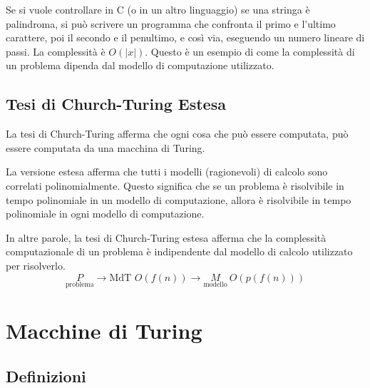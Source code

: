 Se si vuole controllare in C (o in un altro linguaggio) se una stringa è palindroma, si può scrivere un programma che confronta il primo e l'ultimo carattere, poi il secondo e il penultimo, e così via, eseguendo un numero lineare di passi. La complessità è $O(|x|)$. Questo è un esempio di come la complessità di un problema dipenda dal modello di computazione utilizzato.


\section{Tesi di Church-Turing Estesa} La tesi di Church-Turing afferma che ogni cosa che può essere computata, può essere computata da una macchina di Turing.

La versione estesa afferma che tutti i modelli (ragionevoli) di calcolo sono correlati polinomialmente. Questo significa che se un problema è risolvibile in tempo polinomiale in un modello di computazione, allora è risolvibile in tempo polinomiale in ogni modello di computazione.

In altre parole, la tesi di Church-Turing estesa afferma che la complessità computazionale di un problema è indipendente dal modello di calcolo utilizzato per risolverlo.
$$
    \underset{\text{problema}}{P} \to \text{MdT }O(f(n)) \to \underset{\text{modello}}{M}~O(p(f(n)))  
$$




\chapter{Macchine di Turing}


\section{Definizioni}

